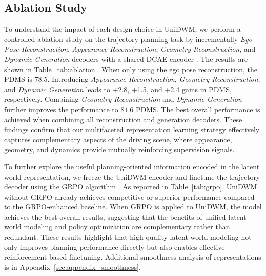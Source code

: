 \subsection{Ablation Study}
To understand the impact of each design choice in UniDWM, we perform a controlled ablation study on the trajectory planning task by incrementally {\textit{Ego Pose Reconstruction}}, {\textit{Appearance Reconstruction}}, {\textit{Geometry Reconstruction}}, and {\textit{Dynamic Generation}} decoders with a shared DCAE encoder \cite{dcae}. The results are shown in Table~\ref{tab:ablation}. When only using the ego pose reconstruction, the PDMS is 78.5. Introducing {\textit{Appearance Reconstruction}}, {\textit{Geometry Reconstruction}}, and {\textit{Dynamic Generation}} leads to +2.8, +1.5, and +2.4 gains in PDMS, respectively. Combining {\textit{Geometry Reconstruction}} and {\textit{Dynamic Generation}} further improves the performance to $81.6$ PDMS. The best overall performance is achieved when combining all reconstruction and generation decoders. These findings confirm that our multifaceted representation learning strategy effectively captures complementary aspects of the driving scene, where appearance, geometry, and dynamics provide mutually reinforcing supervision signals. 

To further explore the useful planning-oriented information encoded in the latent world representation, we freeze the UniDWM encoder and finetune the trajectory decoder using the GRPO algorithm \cite{li2025recogdrive}. As reported in Table~\ref{tab:grpo}, UniDWM without GRPO already achieves competitive or superior performance compared to the GRPO-enhanced baseline. When GRPO is applied to UniDWM, the model achieves the best overall results, suggesting that the benefits of unified latent world modeling and policy optimization are complementary rather than redundant. These results highlight that high-quality latent world modeling not only improves planning performance directly but also enables effective reinforcement-based finetuning. Additional smoothness analysis of representations is in Appendix~\ref{sec:appendix_smoothness}. 
